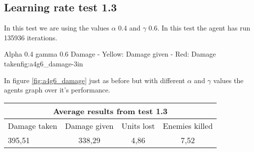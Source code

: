 
\subsection*{Learning rate test 1.3}
In this test we are using the values $\alpha$ 0.4 and $\gamma$ 0.6. In this test the agent has run 135936 iterations.


			{Alpha 0.4 gamma 0.6 Damage - Yellow: Damage given - Red: Damage taken}{fig:a4g6_damage}{-3in}

In figure \ref{fig:a4g6_damage} just as before but with different $\alpha$ and $\gamma$ values the agents graph over it's performance.




\begin{centering}
 \begin{tabular}{|l|c|c|c|}
	\multicolumn{4}{c}{Average results from test 1.3} \\
	\hline
		Damage taken & Damage given & Units lost & Enemies killed\\
	\hline
		395,51 & 338,29 & 4,86 & 7,52 \\
	\hline
\end{tabular}
\label{test1.3}
\end{centering}
\newpage

